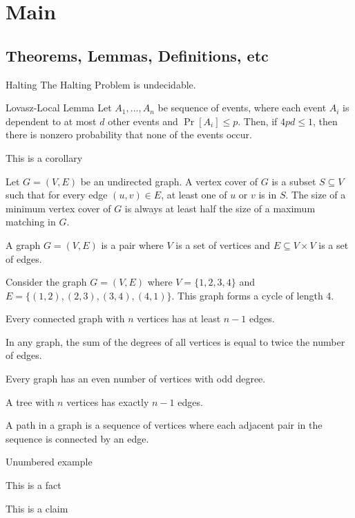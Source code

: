 \section{Main}
\subsection{Theorems, Lemmas, Definitions, etc}
\begin{theorem}{Halting}{}
    The Halting Problem is undecidable.
\end{theorem}
\begin{lemma}{Lovasz-Local Lemma}{}
Let $A_1, \dots, A_n$ be sequence of events, where each event $A_i$ is dependent to at most $d$ other events and $\Pr[A_i] \le p$. 
Then, if $4pd \le 1$, then there is nonzero probability that none of the events occur.
\end{lemma}
\begin{corollary}{}{}
This is a corollary
\end{corollary}
\begin{proposition}{}{}
Let $G = (V, E)$ be an undirected graph. A vertex cover of $G$ is a subset $S \subseteq V$ such that for every edge $(u, v) \in E$, at least one of $u$ or $v$ is in $S$. The size of a minimum vertex cover of $G$ is always at least half the size of a maximum matching in $G$.
\end{proposition}

\begin{definition}{}{}
    A graph $G = (V, E)$ is a pair where $V$ is a set of vertices and $E \subseteq V \times V$ is a set of edges.
\end{definition}
\begin{example}{}{}
    Consider the graph $G = (V, E)$ where $V = \{1, 2, 3, 4\}$ and $E = \{(1,2), (2,3), (3,4), (4,1)\}$. This graph forms a cycle of length 4.
\end{example}
\begin{theorem*}{}{}
    Every connected graph with $n$ vertices has at least $n-1$ edges.
\end{theorem*}
\begin{lemma*}{}{}
    In any graph, the sum of the degrees of all vertices is equal to twice the number of edges.
\end{lemma*}
\begin{corollary*}{}{}
    Every graph has an even number of vertices with odd degree.
\end{corollary*}
\begin{proposition*}{}{}
    A tree with $n$ vertices has exactly $n-1$ edges.
\end{proposition*}
\begin{definition*}{}{}
    A path in a graph is a sequence of vertices where each adjacent pair in the sequence is connected by an edge.
\end{definition*}
\begin{example*}{}{}
Unumbered example
\end{example*}
\begin{fact}{}{}
This is a fact
\end{fact}
\begin{claim}{}{}
This is a claim
\end{claim}


